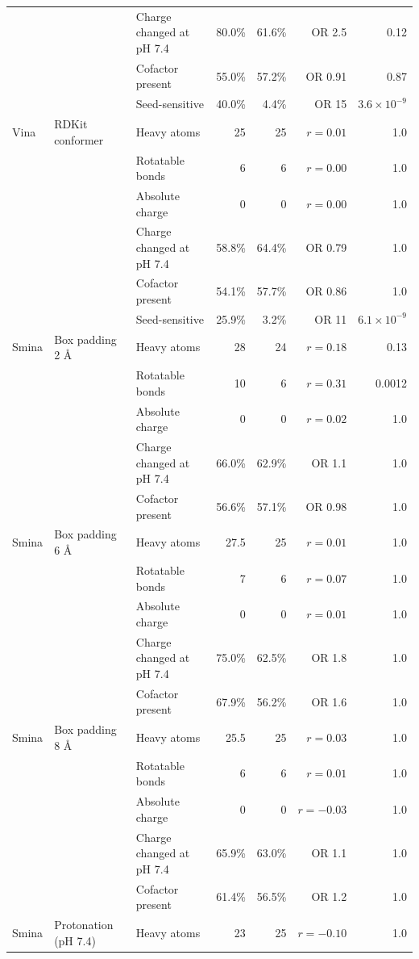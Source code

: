 \begin{longtable}{lllrrrr}
 &  & Charge changed at pH 7.4 & 80.0\% & 61.6\% & OR 2.5 & 0.12 \\
 &  & Cofactor present & 55.0\% & 57.2\% & OR 0.91 & 0.87 \\
 &  & Seed-sensitive & 40.0\% & 4.4\% & OR 15 & $3.6\times10^{-9}$ \\
\addlinespace
Vina & RDKit conformer & Heavy atoms & 25 & 25 & $r = 0.01$ & 1.0 \\
 &  & Rotatable bonds & 6 & 6 & $r = 0.00$ & 1.0 \\
 &  & Absolute charge & 0 & 0 & $r = 0.00$ & 1.0 \\
 &  & Charge changed at pH 7.4 & 58.8\% & 64.4\% & OR 0.79 & 1.0 \\
 &  & Cofactor present & 54.1\% & 57.7\% & OR 0.86 & 1.0 \\
 &  & Seed-sensitive & 25.9\% & 3.2\% & OR 11 & $6.1\times10^{-9}$ \\
\addlinespace
Smina & Box padding 2 \AA{} & Heavy atoms & 28 & 24 & $r = 0.18$ & 0.13 \\
 &  & Rotatable bonds & 10 & 6 & $r = 0.31$ & 0.0012 \\
 &  & Absolute charge & 0 & 0 & $r = 0.02$ & 1.0 \\
 &  & Charge changed at pH 7.4 & 66.0\% & 62.9\% & OR 1.1 & 1.0 \\
 &  & Cofactor present & 56.6\% & 57.1\% & OR 0.98 & 1.0 \\
\addlinespace
Smina & Box padding 6 \AA{} & Heavy atoms & 27.5 & 25 & $r = 0.01$ & 1.0 \\
 &  & Rotatable bonds & 7 & 6 & $r = 0.07$ & 1.0 \\
 &  & Absolute charge & 0 & 0 & $r = 0.01$ & 1.0 \\
 &  & Charge changed at pH 7.4 & 75.0\% & 62.5\% & OR 1.8 & 1.0 \\
 &  & Cofactor present & 67.9\% & 56.2\% & OR 1.6 & 1.0 \\
\addlinespace
Smina & Box padding 8 \AA{} & Heavy atoms & 25.5 & 25 & $r = 0.03$ & 1.0 \\
 &  & Rotatable bonds & 6 & 6 & $r = 0.01$ & 1.0 \\
 &  & Absolute charge & 0 & 0 & $r = -0.03$ & 1.0 \\
 &  & Charge changed at pH 7.4 & 65.9\% & 63.0\% & OR 1.1 & 1.0 \\
 &  & Cofactor present & 61.4\% & 56.5\% & OR 1.2 & 1.0 \\
\addlinespace
Smina & Protonation (pH 7.4) & Heavy atoms & 23 & 25 & $r = -0.10$ & 1.0 \\

\end{longtable}
